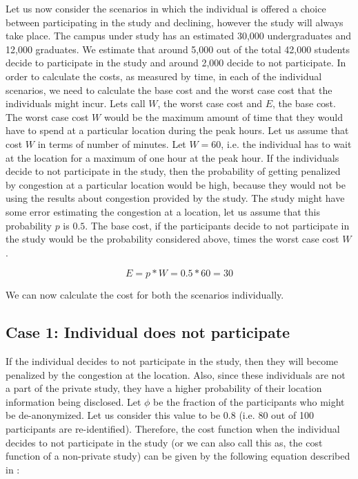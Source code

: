 \documentclass[conference]{IEEEtran}
\begin{document}
Let us now consider the scenarios in which the individual is offered a choice between participating in the study and declining, however the study will always take place. The campus under study has an estimated 30,000 undergraduates and 12,000 graduates. We estimate that around 5,000 out of the total 42,000 students decide to participate in the study and around 2,000 decide to not participate. In order to calculate the costs, as measured by time, in each of the individual scenarios, we need to calculate the base cost and the worst case cost that the individuals might incur. Lets call $W$, the worst case cost and $E$, the base cost. 
	The worst case cost $W$ would be the maximum amount of time that they would have to spend at a particular location during the peak hours. Let us assume that cost $W$ in terms of number of minutes. Let $W = 60$,  i.e. the individual has to wait at the location for a maximum of one hour at the peak hour. If the individuals decide to not participate in the study, then the probability of getting penalized by congestion at a particular location would be high, because they would not be using the results about congestion provided by the study. The study might have some error estimating the congestion at a location, let us assume that this probability $p$ is $0.5$. 
	The base cost, if the participants decide to not participate in the study would be the probability considered above, times the worst case cost $W$.

\begin{equation}
E = p * W
   =  0.5 * 60
   = 30
\label{equn:worstcase}
\end{equation}

We can now calculate the cost for both the scenarios individually.

\subsection{Case 1: Individual does not participate}

If the individual decides to not participate in the study, then they will become penalized by the congestion at the location. Also, since these individuals are not a part of the private study, they have a higher probability of their location information being disclosed. Let $\phi$ be the fraction of the participants who might be de-anonymized. Let us consider this value to be 0.8 (i.e. 80 out of 100 participants are re-identified). Therefore, the cost function when the individual decides to not participate in the study (or we can also call this as, the cost function of a non-private study) can be given by the following equation described in \cite{DBLP:conf/csfw/HsuGHKNPR14}:
\end{document}
